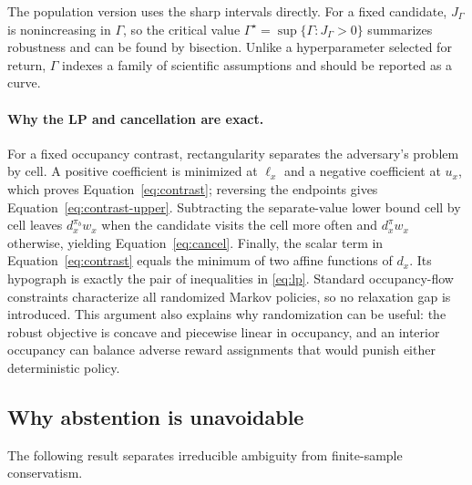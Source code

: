 \documentclass[letterpaper]{article}
\theoremstyle{remark}
\begin{document}
\begin{center}
\end{center}
The population version uses the sharp intervals directly. For a fixed candidate, $J_\Gamma$ is nonincreasing in $\Gamma$, so the critical value $\Gamma^\star=\sup\{\Gamma:J_\Gamma>0\}$ summarizes robustness and can be found by bisection. Unlike a hyperparameter selected for return, $\Gamma$ indexes a family of scientific assumptions and should be reported as a curve.

\paragraph{Why the LP and cancellation are exact.}
For a fixed occupancy contrast, rectangularity separates the adversary's problem by cell. A positive coefficient is minimized at $\ell_x$ and a negative coefficient at $u_x$, which proves Equation~\eqref{eq:contrast}; reversing the endpoints gives Equation~\eqref{eq:contrast-upper}. Subtracting the separate-value lower bound cell by cell leaves $d_x^{\pi_b}w_x$ when the candidate visits the cell more often and $d_x^\pi w_x$ otherwise, yielding Equation~\eqref{eq:cancel}. Finally, the scalar term in Equation~\eqref{eq:contrast} equals the minimum of two affine functions of $d_x$. Its hypograph is exactly the pair of inequalities in \eqref{eq:lp}. Standard occupancy-flow constraints characterize all randomized Markov policies, so no relaxation gap is introduced. This argument also explains why randomization can be useful: the robust objective is concave and piecewise linear in occupancy, and an interior occupancy can balance adverse reward assignments that would punish either deterministic policy.

\subsection{Why abstention is unavoidable}
The following result separates irreducible ambiguity from finite-sample conservatism.
\end{document}
